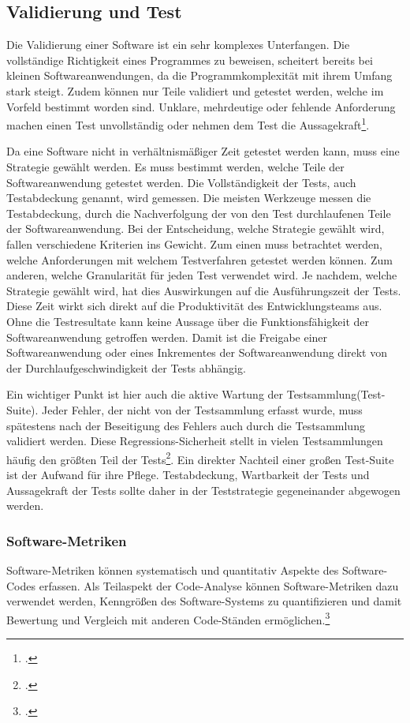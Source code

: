 \subsection{Validierung und Test}

Die Validierung einer Software ist ein sehr komplexes Unterfangen. Die vollständige Richtigkeit eines Programmes 
zu beweisen, scheitert bereits bei kleinen Softwareanwendungen, da die Programmkomplexität mit ihrem Umfang stark steigt. Zudem
können nur Teile validiert und getestet werden, welche im Vorfeld bestimmt worden sind. Unklare, mehrdeutige oder 
fehlende Anforderung machen einen Test unvollständig oder nehmen dem Test die Aussagekraft\footcite[S. 243 Kapitel 4.6][]{software-quality2008}.

Da eine Software nicht in verhältnismäßiger Zeit getestet werden kann, muss eine Strategie gewählt werden. Es muss bestimmt werden, welche Teile der Softwareanwendung getestet werden. Die Vollständigkeit der Tests, auch Testabdeckung genannt, wird gemessen. Die meisten Werkzeuge messen die Testabdeckung, durch die Nachverfolgung der von den Test durchlaufenen Teile der Softwareanwendung. Bei der Entscheidung, welche Strategie gewählt wird, fallen verschiedene Kriterien ins Gewicht. Zum einen muss betrachtet werden, welche Anforderungen mit welchem Testverfahren getestet werden können. Zum anderen, welche Granularität für jeden Test verwendet wird.
Je nachdem, welche Strategie gewählt wird, hat dies Auswirkungen auf die Ausführungszeit der Tests. Diese Zeit wirkt sich direkt auf die Produktivität des Entwicklungsteams aus. Ohne die Testresultate kann keine Aussage über die Funktionsfähigkeit der Softwareanwendung getroffen werden. Damit ist die Freigabe einer Softwareanwendung oder eines Inkrementes der Softwareanwendung direkt von der Durchlaufgeschwindigkeit der Tests abhängig. 

Ein wichtiger Punkt ist hier auch die aktive Wartung der Testsammlung(Test-Suite). Jeder Fehler, der nicht von der Testsammlung erfasst wurde, muss spätestens nach der Beseitigung des Fehlers auch durch die Testsammlung validiert werden. Diese Regressions-Sicherheit stellt in vielen Testsammlungen häufig den größten Teil der Tests\footcite[vgl.][]{software-quality2008}. Ein direkter Nachteil einer großen Test-Suite ist der Aufwand für ihre Pflege. Testabdeckung, Wartbarkeit der Tests und Aussagekraft der Tests sollte daher in der Teststrategie gegeneinander abgewogen werden.

\subsubsection{Software-Metriken}
\label{subsubsec:base-metrics}
Software-Metriken können systematisch und quantitativ Aspekte des Software-Codes erfassen. Als Teilaspekt der Code-Analyse können Software-Metriken dazu verwendet werden, Kenngrößen des Software-Systems zu quantifizieren und damit Bewertung und Vergleich mit anderen Code-Ständen ermöglichen.\footcite[S.247][]{software-quality2008}

